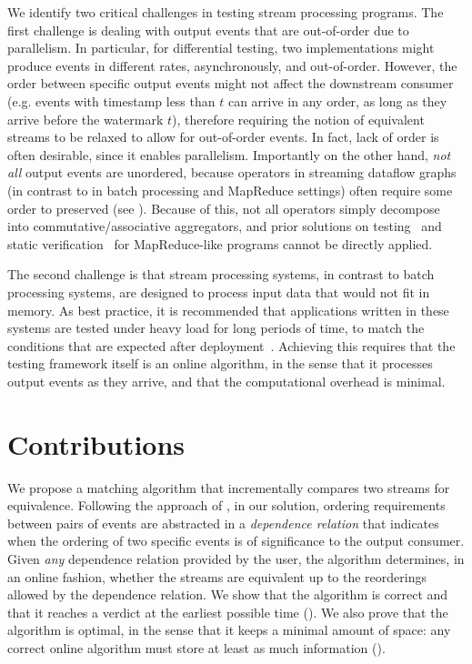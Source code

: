 We identify two critical challenges in testing stream processing programs.
The first challenge is dealing with output events that are out-of-order due to parallelism. In particular, for differential testing,
two implementations might produce events in different rates, asynchronously, and out-of-order.
However, the order between specific output events might not affect the downstream consumer (e.g. events with timestamp less than $t$ can arrive in any order, as long as they arrive before the watermark $t$),
therefore requiring the notion of equivalent streams to be relaxed to allow for out-of-order events.
In fact, lack of order is often desirable, since it enables parallelism.
Importantly on the other hand, \emph{not all} output events are unordered, because operators in streaming dataflow graphs (in contrast to in batch processing and MapReduce settings) often require some order to preserved (see ).
Because of this, not all operators simply decompose into commutative/associative aggregators, and prior solutions on testing~\cite{csallner2011new,xu2013semantic,marynowski2012testing,chen2016commutativity} and static verification~\cite{liu2014automating,raychev2015parallelizing} for MapReduce-like programs cannot be directly applied.

The second challenge is that
stream processing systems, in contrast to batch processing systems,
are designed to process input data that would not fit
in memory.  As best practice, it is recommended that applications written in these systems are
tested under heavy load for long periods of time, to match the
conditions that are expected after
deployment~\cite{vianna2019exploratory}. Achieving this requires that
the testing framework itself is an online algorithm, in the sense that
it processes output events as they arrive, and that the computational overhead is minimal.

\section{Contributions}

We propose a matching algorithm that incrementally compares two streams for equivalence.
Following the approach of , in our solution, ordering requirements between pairs of events are abstracted in a \emph{dependence relation} that indicates when the ordering of two specific events is of significance to the output consumer.
Given \emph{any} dependence relation provided by the user, the algorithm determines, in an online fashion, whether the streams are equivalent up to the reorderings allowed by the dependence relation.
We show that the algorithm is correct and that it reaches a verdict at the earliest possible time ().
We also prove that the algorithm is optimal, in the sense that it keeps a minimal amount of space: any correct online algorithm must store at least as much information ().

